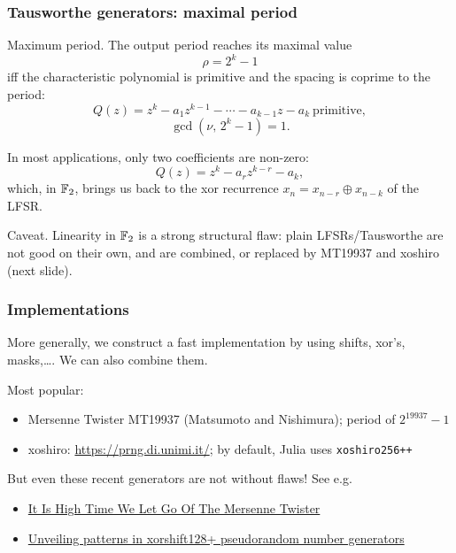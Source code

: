 \documentclass[aspectratio=169]{beamer}
\def\blue{\color{blue}}
\def\red{\color{red}}
\begin{document}
	\begin{frame}
		\frametitle{Tausworthe generators: maximal period}
		
		{\blue Maximum period.} The output period reaches its maximal value
		\[
			\rho = 2^k - 1
		\]
		iff the characteristic polynomial is {\blue primitive} and the spacing is
		{\blue coprime} to the period:
		\[
			Q(z) = z^k - a_1 z^{k-1} - \cdots - a_{k-1} z - a_k \ \text{primitive},
		\]
		\[
			\gcd(\nu,\, 2^k - 1) = 1.
		\]
		
		In most applications, only two coefficients are non-zero:
		\[
			Q(z) = z^k - a_r z^{k-r} - a_k,
		\]
		which, in ${\mathbb{F}}_2$, brings us back to the xor recurrence
		$x_n = x_{n-r} \oplus x_{n-k}$ of the LFSR.
		
		\vfill
		
		{\red Caveat.} Linearity in ${\mathbb{F}}_2$ is a strong structural flaw: plain
		LFSRs/Tausworthe are {\blue not good on their own}, and are combined, or replaced
		by MT19937 and xoshiro (next slide).
		
	\end{frame}
	
	\begin{frame}[fragile]
		\frametitle{Implementations}
		
		More generally, we construct a fast implementation by using shifts,
		xor's, masks,\ldots. We can also combine them.
		
		\mbox{}
		
Most popular:
\begin{itemize}
	\item 
	Mersenne Twister MT19937 (Matsumoto and Nishimura); period of $2^{19937}-1$
	\item
	xoshiro: \url{https://prng.di.unimi.it/}; by default, Julia uses \verb|xoshiro256++|
\end{itemize}


\mbox{}

But even these recent generators are not without flaws! See e.g.
\begin{itemize}
	\item 
	\href{https://arxiv.org/abs/1910.06437}{\blue It Is High Time We Let Go Of The Mersenne Twister}
	\item
	\href{https://www.sciencedirect.com/science/article/abs/pii/S0377042721004131}{\blue Unveiling patterns in xorshift128+ pseudorandom number generators}
\end{itemize}
		
\end{frame}
\end{document}
